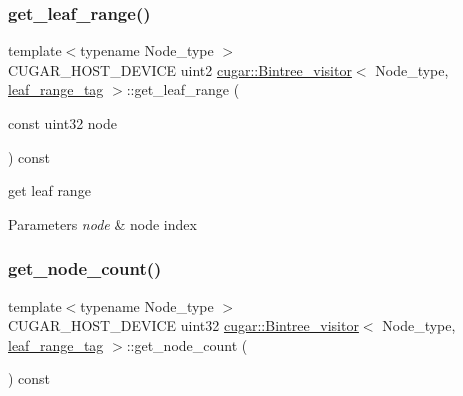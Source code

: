 \subsubsection{\texorpdfstring{get\+\_\+leaf\+\_\+range()}{get\_leaf\_range()}}
{\footnotesize\ttfamily template$<$typename Node\+\_\+type $>$ \\
C\+U\+G\+A\+R\+\_\+\+H\+O\+S\+T\+\_\+\+D\+E\+V\+I\+CE uint2 \hyperlink{structcugar_1_1_bintree__visitor}{cugar\+::\+Bintree\+\_\+visitor}$<$ Node\+\_\+type, \hyperlink{structcugar_1_1leaf__range__tag}{leaf\+\_\+range\+\_\+tag} $>$\+::get\+\_\+leaf\+\_\+range (\begin{DoxyParamCaption}\item[{const uint32}]{node }\end{DoxyParamCaption}) const\hspace{0.3cm}{\ttfamily [inline]}}

get leaf range


\begin{DoxyParams}{Parameters}
{\em node} & node index \\
\hline
\end{DoxyParams}
\mbox{\label{structcugar_1_1_bintree__visitor_3_01_node__type_00_01leaf__range__tag_01_4_a50bb8a7e19e17bfd131f9af1c4f51495}} 
\subsubsection{\texorpdfstring{get\+\_\+node\+\_\+count()}{get\_node\_count()}}
{\footnotesize\ttfamily template$<$typename Node\+\_\+type $>$ \\
C\+U\+G\+A\+R\+\_\+\+H\+O\+S\+T\+\_\+\+D\+E\+V\+I\+CE uint32 \hyperlink{structcugar_1_1_bintree__visitor}{cugar\+::\+Bintree\+\_\+visitor}$<$ Node\+\_\+type, \hyperlink{structcugar_1_1leaf__range__tag}{leaf\+\_\+range\+\_\+tag} $>$\+::get\+\_\+node\+\_\+count (\begin{DoxyParamCaption}{ }\end{DoxyParamCaption}) const\hspace{0.3cm}{\ttfamily [inline]}}

